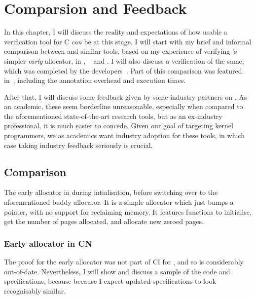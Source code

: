 \chapter{ Comparsion and Feedback}

\margintoc{}

In this chapter, I will discuss the reality and expectations of how usable a
verification tool for C \emph{can} be at this stage. I will start with my brief
and informal comparison between  and similar tools, based on my
experience of verifying 's simpler \emph{early} allocator, in ,
~ and
.
I will also discuss a  verification of the same, which was
completed by the developers~. Part of this
comparison was featured in~, including the annotation
overhead and execution times.

After that, I will discuss some feedback given by some industry partners on
. As an academic, these seem borderline unreasonable, especially when
compared to the aforementioned state-of-the-art research tools, but as an
ex-industry professional, it is much easier to concede. Given our goal of
targeting kernel programmers, we as academics want industry adoption for these
tools, in which case taking industry feedback seriously is crucial.

\section{Comparison}

The early allocator in  during intialisation, before switching over to
the aforementioned buddy allocator. It is a simple allocator which just bumps a
pointer, with no support for reclaiming memory. It features functions to
initialise, get the number of pages allocated, and allocate new zeroed pages.

\subsection{Early allocator in CN}

The proof for the early allocator was not part of CI for , and so is
considerably out-of-date. Nevertheless, I will show and discuss a sample
of the code and specifications, because because I expect updated specifications
to look recognisably similar.


